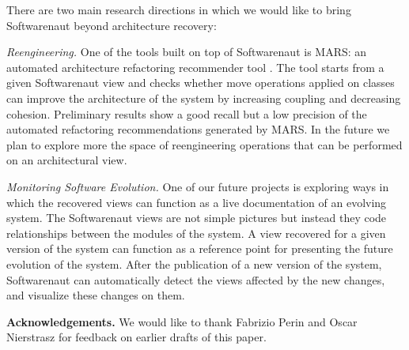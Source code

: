 \documentclass[preprint,12pt]{elsarticle}
\begin{document}
There are two main research directions in which we would like to bring Softwarenaut beyond architecture recovery:

\begin{description}

\item {\em Reengineering.}
One of the tools built on top of Softwarenaut is MARS: an automated architecture refactoring recommender tool \cite{boeckmann-mars}. The tool starts from a given Softwarenaut view and checks whether move operations applied on classes can improve the architecture of the system by increasing coupling and decreasing cohesion. Preliminary results show a good recall but a low precision of the  automated refactoring recommendations generated by MARS. In the future we plan to explore more the space of reengineering operations that can be performed on an architectural view.


\item {\em Monitoring Software Evolution.}
One of our future projects is exploring ways in which the recovered views can function as a live documentation of an evolving system. The Softwarenaut views are not simple pictures but instead they code relationships between the modules of the system. A view recovered for a given version of the system can function as a reference point for presenting the future evolution of the system. After the publication of a new version of the system, Softwarenaut can automatically detect the views affected by the new changes, and visualize these changes on them.

\end{description}


\vspace{0.5cm}
\footnotesize
{\bf Acknowledgements.} We would like to thank Fabrizio Perin and Oscar Nierstrasz for feedback on earlier drafts of this paper.



\newpage

\footnotesize


\end{document}
